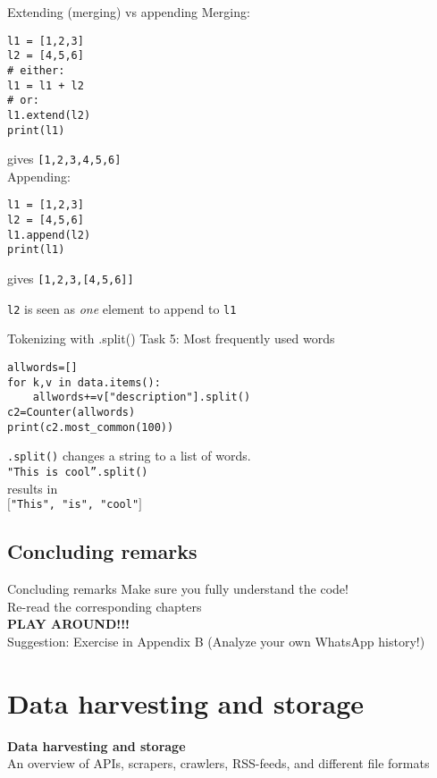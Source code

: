 \documentclass{beamer}
\begin{document}
\begin{frame}[fragile]{Extending (merging) vs appending}
Merging:
\begin{lstlisting}
l1 = [1,2,3]
l2 = [4,5,6]
# either:
l1 = l1 + l2
# or:
l1.extend(l2)
print(l1)
\end{lstlisting}
gives \texttt{[1,2,3,4,5,6]}
~\\

Appending:
\begin{lstlisting}
l1 = [1,2,3]
l2 = [4,5,6]
l1.append(l2)
print(l1)
\end{lstlisting}
gives \texttt{[1,2,3,[4,5,6]]}

\texttt{l2} is seen as \emph{one} element to append to \texttt{l1}
\end{frame}


\begin{frame}[fragile]{Tokenizing with .split()}
Task 5: Most frequently used words
\begin{lstlisting}
allwords=[]
for k,v in data.items():
    allwords+=v["description"].split()
c2=Counter(allwords)
print(c2.most_common(100))
\end{lstlisting}
\scriptsize{
\texttt{.split()} changes a string to a list of words.\\ \texttt{"This is cool''.split()} \\results in\\ \texttt{$[$"This", "is", "cool"$]$}\\
}
\end{frame}


\subsection{Concluding remarks}
\begin{frame}{Concluding remarks}
Make sure you fully understand the code!\\
\vspace{1cm}
Re-read the corresponding chapters\\
\vspace{1cm}
\textbf{PLAY AROUND!!!}\\

Suggestion: Exercise in Appendix B (Analyze your own WhatsApp history!)
\end{frame}



\section{Data harvesting and storage}
\begin{frame}[plain]
\textbf{Data harvesting and storage}\\
\vspace{1cm}
An overview of APIs, scrapers, crawlers, RSS-feeds, and different file formats
\end{frame}
\end{document}
